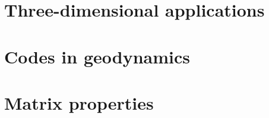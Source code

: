 \documentclass[a4paper]{article}
\begin{document}
\appendix %

\newpage %
\section{Three-dimensional applications}  %
\newpage %
\section{Codes in geodynamics}  %
\newpage %
\section{Matrix properties}  %


\newpage %
\printindex %
\newpage %
\listoftodos[Notes] %
\end{document}
